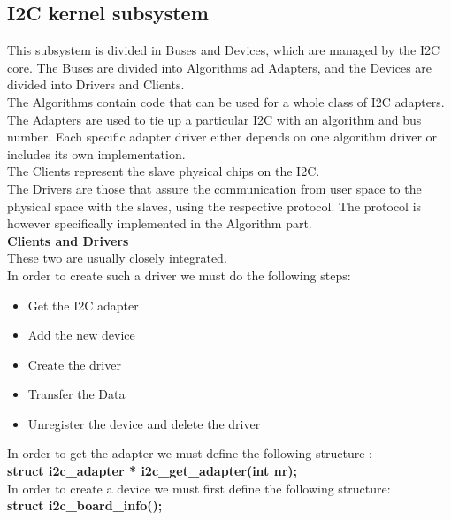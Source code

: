 \documentclass[l2pt, letterpaper]{article}
\begin{document}
\subsection{I2C kernel subsystem}

This subsystem is divided in Buses and Devices, which are managed by the I2C
core. The Buses are divided into Algorithms ad Adapters, and the Devices are
divided into Drivers and Clients.\\

The Algorithms contain code that can be used for a whole class of I2C adapters.\\

The Adapters are used to tie up a particular I2C with an algorithm and bus
number. Each specific adapter driver either depends on one algorithm driver or
includes its own implementation.\\

The Clients represent the slave physical chips on the I2C.\\

The Drivers are those that assure the communication from user space to the
physical space with the slaves, using the respective protocol. The protocol is
however specifically implemented in the Algorithm part.\\

\textbf{Clients and Drivers}\\

These two are usually closely integrated.\\

In order to create such a driver we must do the following steps:

\begin{itemize}
    \item Get the I2C adapter
    \item Add the new device
    \item Create the driver
    \item Transfer the Data
    \item Unregister the device and delete the driver
\end{itemize}

In order to get the adapter we must define the following structure :\\
\textbf{struct i2c\_adapter * i2c\_get\_adapter(int nr);}\\

In order to create a device we must first define the following structure:\\
\textbf{struct i2c\_board\_info();}\\
\end{document}
